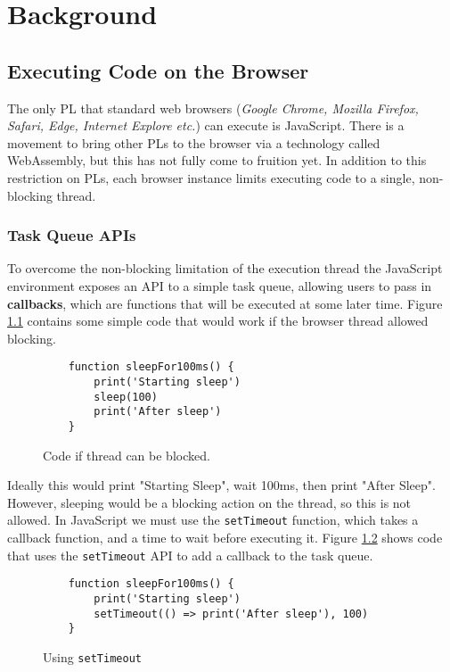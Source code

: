 \chapter{Background}

\section{Executing Code on the Browser}

The only PL that standard web browsers (\emph{Google Chrome, Mozilla Firefox, Safari, Edge, Internet Explore etc.}) can execute is JavaScript. There is a movement to bring other PLs to the browser via a technology called WebAssembly, but this has not fully come to fruition yet.  
In addition to this restriction on PLs, each browser instance limits executing code to a single, non-blocking thread.

\subsection{Task Queue APIs}
To overcome the non-blocking limitation of the execution thread the JavaScript environment exposes an API to a simple task queue, allowing users to pass in \textbf{callbacks}, which are functions that will be executed at some later time. Figure \ref{blockingcode} contains some simple code that would work if the browser thread allowed blocking.

\begin{figure}
    \caption{Code if thread can be blocked.}
    \label{blockingcode}
    \begin{lstlisting}
    function sleepFor100ms() {
        print('Starting sleep')
        sleep(100)
        print('After sleep')
    }
    \end{lstlisting}
\end{figure}

Ideally this would print "Starting Sleep", wait 100ms, then print "After Sleep". However, sleeping would be a blocking action on the thread, so this is not allowed. In JavaScript we must use the \texttt{setTimeout} function, which takes a callback function, and a time to wait before executing it. Figure \ref{setTimeoutCode} shows code that uses the \texttt{setTimeout} API to add a callback to the task queue.

\begin{figure}
    \caption{Using \texttt{setTimeout}}
    \label{setTimeoutCode}
    \begin{lstlisting}
    function sleepFor100ms() {
        print('Starting sleep')
        setTimeout(() => print('After sleep'), 100)
    }
    \end{lstlisting}
\end{figure}

